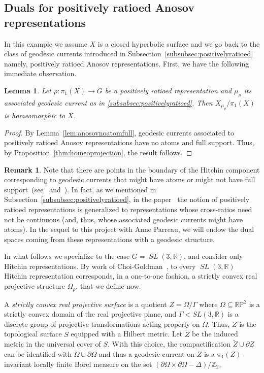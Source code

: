 \documentclass[12pt,article]{amsart}
\numberwithin{equation}{section}
\numberwithin{figure}{section}
\newtheorem{lemma}[equation]{Lemma}
\theoremstyle{definition}
\newtheorem{remark}[equation]{Remark}
\theoremstyle{plain}
\newcommand\R{\ensuremath{\mathbb{R}}}
\newcommand*{\wt}[1]{\widetilde{#1}}
\DeclareMathOperator{\SL}{\mathit{SL}}
\begin{document}
\subsection{Duals for positively ratioed Anosov representations}
\label{ex:positivelyratioed}
In this example we assume $X$ is a closed hyperbolic surface and we go back to the class of geodesic currents introduced in Subsection~\ref{subsubsec:positivelyratioed} namely, positively ratioed Anosov representations.
First, we have the following immediate observation.

\begin{lemma}
Let $\rho \colon \pi_1(X) \to G$ be a positively ratioed representation and $\mu_{\rho}$ its associated geodesic current as in \ref{subsubsec:positivelyratioed}. Then $X_{\mu_{\rho}}/\pi_1(X)$ is homeomorphic to $X$.
\end{lemma}
\begin{proof}
By Lemma~\ref{lem:anosovnoatomfull}, geodesic currents associated to positively ratioed Anosov representations have no atoms and full support.
Thus, by Proposition~\ref{thm:homeoprojection}, the result follows.
\end{proof}

\begin{remark}
Note that there are points in the boundary of the Hitchin component corresponding to geodesic currents that might have atoms or might not have full support~(see~\cite{BIPP21:Currents} and~\cite{BIPP21:Crossratios}).
In fact, as we mentioned in Subsection~\ref{subsubsec:positivelyratioed}, in the paper~\cite{BIPP21:Crossratios} the notion of positively ratioed representations is generalized to representations whose cross-ratios need not be continuous (and, thus, whose associated geodesic currents might have atoms). In the sequel to this project with Anne Parreau, we will endow the dual spaces coming from these representations with a geodesic structure.
\end{remark}

In what follows we specialize to the case $G=\SL(3,\mathbb{R})$, and consider only Hitchin representations.
By work of Choi-Goldman~\cite{CG93:ConvexProjective}, to every $\SL(3,\mathbb{R})$ Hitchin representation corresponds, in a one-to-one fashion, a strictly convex real projective structure $\Omega_{\rho}$, that we define now.

A \emph{strictly convex real projective surface} is a quotient $Z = \Omega / \Gamma$ where $\Omega \subseteq \mathbb{RP}^2$ is a strictly convex domain of the real projective plane, and $\Gamma < SL(3, \R)$ is a discrete group of projective transformations acting properly on $\Omega$. Thus, $Z$ is the topological surface $S$ equipped with a Hilbert metric.
Let $\wt{Z}$ be the induced metric in the universal cover of $S$. With this choice, the compactification $\wt{Z} \cup \partial Z$ can be identified with $\Omega \cup \partial \Omega$ and thus a geodesic current on $Z$ is a $\pi_1(Z)$-invariant locally finite Borel measure on the set
$(\partial \Omega \times \partial \Omega - \Delta)/\mathbb{Z}_2$.
\end{document}
